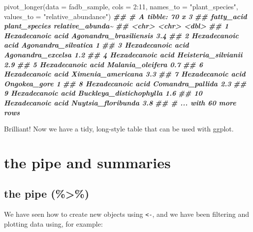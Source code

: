 \documentclass[
]{krantz}
\newenvironment{Shaded}{\begin{snugshade}}{\end{snugshade}}
\newcommand{\AttributeTok}[1]{\textcolor[rgb]{0.77,0.63,0.00}{#1}}
\newcommand{\DecValTok}[1]{\textcolor[rgb]{0.00,0.00,0.81}{#1}}
\newcommand{\DocumentationTok}[1]{\textcolor[rgb]{0.56,0.35,0.01}{\textbf{\textit{#1}}}}
\newcommand{\FunctionTok}[1]{\textcolor[rgb]{0.00,0.00,0.00}{#1}}
\newcommand{\NormalTok}[1]{#1}
\newcommand{\SpecialCharTok}[1]{\textcolor[rgb]{0.00,0.00,0.00}{#1}}
\newcommand{\StringTok}[1]{\textcolor[rgb]{0.31,0.60,0.02}{#1}}
\begin{document}
\begin{Shaded}
\begin{Highlighting}[]
\FunctionTok{pivot\_longer}\NormalTok{(}\AttributeTok{data =}\NormalTok{ fadb\_sample, }\AttributeTok{cols =} \DecValTok{2}\SpecialCharTok{:}\DecValTok{11}\NormalTok{, }\AttributeTok{names\_to =} \StringTok{"plant\_species"}\NormalTok{, }\AttributeTok{values\_to =} \StringTok{"relative\_abundance"}\NormalTok{)}
\DocumentationTok{\#\# \# A tibble: 70 x 3}
\DocumentationTok{\#\#    fatty\_acid        plant\_species           relative\_abunda\textasciitilde{}}
\DocumentationTok{\#\#    \textless{}chr\textgreater{}             \textless{}chr\textgreater{}                              \textless{}dbl\textgreater{}}
\DocumentationTok{\#\#  1 Hexadecanoic acid Agonandra\_brasiliensis               3.4}
\DocumentationTok{\#\#  2 Hexadecanoic acid Agonandra\_silvatica                  1  }
\DocumentationTok{\#\#  3 Hexadecanoic acid Agonandra\_excelsa                    1.2}
\DocumentationTok{\#\#  4 Hexadecanoic acid Heisteria\_silvianii                  2.9}
\DocumentationTok{\#\#  5 Hexadecanoic acid Malania\_oleifera                     0.7}
\DocumentationTok{\#\#  6 Hexadecanoic acid Ximenia\_americana                    3.3}
\DocumentationTok{\#\#  7 Hexadecanoic acid Ongokea\_gore                         1  }
\DocumentationTok{\#\#  8 Hexadecanoic acid Comandra\_pallida                     2.3}
\DocumentationTok{\#\#  9 Hexadecanoic acid Buckleya\_distichophylla              1.6}
\DocumentationTok{\#\# 10 Hexadecanoic acid Nuytsia\_floribunda                   3.8}
\DocumentationTok{\#\# \# ... with 60 more rows}
\end{Highlighting}
\end{Shaded}

Brilliant! Now we have a tidy, long-style table that can be used with ggplot.

\hypertarget{summary_statistics}{%
\section{the pipe and summaries}\label{summary_statistics}}

\hypertarget{the-pipe}{%
\subsection{the pipe (\%\textgreater\%)}\label{the-pipe}}

We have seen how to create new objects using \texttt{\textless{}-}, and we have been filtering and plotting data using, for example:
\end{document}
